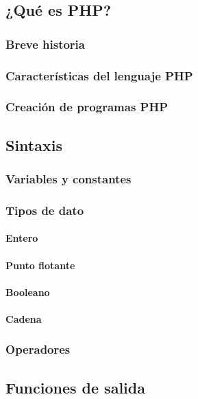 \documentclass[12pt]{report}
\begin{document}
		\subsection{¿Qué es PHP?}
			\subsubsection{Breve historia}
			\subsubsection{Características del lenguaje PHP}
			\subsubsection{Creación de programas PHP}
		\subsection{Sintaxis}
			\subsubsection{Variables y constantes}
			\subsubsection{Tipos de dato}
				\paragraph{Entero}
				\paragraph{Punto flotante}
				\paragraph{Booleano}
				\paragraph{Cadena}
			\subsubsection{Operadores}
		\subsection{Funciones de salida}
\end{document}
